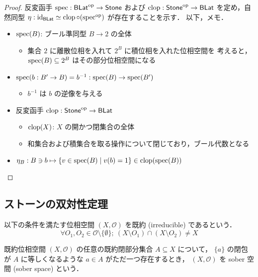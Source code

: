 \documentclass[titlepage]{ltjsreport}
\begin{document}
\begin{proof}
  反変函手 $\operatorname{spec}:\mathsf{BLat}^\mathrm{op}\to\mathsf{Stone}$ および
  $\operatorname{clop}:\mathsf{Stone}^\mathrm{op}\to\mathsf{BLat}$ を定め，自然同型
  $\eta:\mathrm{id}_{\mathsf{BLat}}\simeq\operatorname{clop}\circ(\operatorname{spec}^\mathrm{op})$ が存在することを示す．
  以下，メモ．
  \begin{itemize}
    \item $\operatorname{spec}(B)$: ブール準同型 $B\to2$ の全体
          \begin{itemize}
            \item 集合 $2$ に離散位相を入れて $2^B$ に積位相を入れた位相空間を
                  考えると，$\operatorname{spec}(B)\subseteq 2^B$ はその部分位相空間になる
          \end{itemize}
    \item $\operatorname{spec}(b:B'\to B)=b^{-1}:\operatorname{spec}(B)\to\operatorname{spec}(B')$
          \begin{itemize}
            \item $b^{-1}$ は $b$ の逆像を与える
          \end{itemize}
    \item 反変函手 $\operatorname{clop}:\mathsf{Stone}^\mathrm{op}\to\mathsf{BLat}$
          \begin{itemize}
            \item $\operatorname{clop}(X)$: $X$ の開かつ閉集合の全体
            \item 和集合および積集合を取る操作について閉じており，ブール代数となる
          \end{itemize}
    \item $\eta_B:B\ni b\mapsto\{v\in\operatorname{spec}(B)\mid v(b)=1\}\in\operatorname{clop}(\operatorname{spec}(B))$
  \end{itemize}
\end{proof}

\subsection{ストーンの双対性定理}

\begin{definition}[既約]
  以下の条件を満たす位相空間
  $(X,\mathcal{O})$
  を既約
  (irreducible)
  であるという．
  \begin{equation}
    \forall O_1,O_2\in\mathcal{O}\setminus\{\emptyset\};
    \ (X\setminus O_1)\cap(X\setminus O_2)\neq X
  \end{equation}
\end{definition}

\begin{definition}[sober 空間]
  既約位相空間
  $(X,\mathcal{O})$
  の任意の既約閉部分集合
  $A\subseteq X$
  について，
  $\{a\}$
  の閉包が
  $A$
  に等しくなるような
  $a\in A$
  がただ一つ存在するとき，
  $(X,\mathcal{O})$
  を sober 空間 (sober space) という．
\end{definition}
\end{document}
